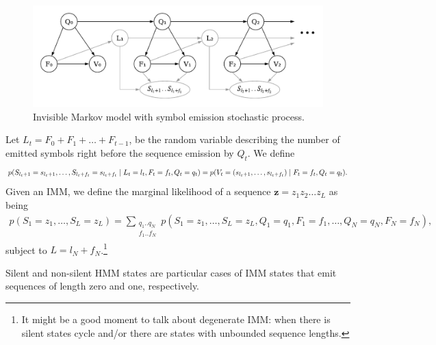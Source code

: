 \begin{figure}[htbp]
\centering
\includegraphics[width=.6\linewidth]{imm-s}
\caption{Invisible Markov model with symbol emission stochastic process.}%
\label{fig:imm-s}
\end{figure}

Let $L_t=F_0+F_1+\dots + F_{t-1}$, be the random variable describing the number of emitted symbols right
before the sequence emission by $Q_t$.
We define
\begin{align*}
    p(S_{l_t+1}=s_{l_t+1}, \dots, S_{l_t+f_t}=s_{l_t+f_t} \;|\; L_t=l_t, F_t=f_t, Q_t=q_t) =
                                p(V_t=(s_{l_t+1}, \dots, s_{l_t+f_t}) \;|\; F_t=f_t, Q_t=q_t).
\end{align*}
Given an IMM, we define the marginal likelihood of a sequence $\mathbf z = z_1z_2\dots z_L$
as being
\begin{align*}
    p(S_1=z_1, \dots, S_L=z_L) = \sum\limits_{\substack{q_1..q_N \\ f_1..f_N}}
        p(S_1=z_1, \dots, S_L=z_L, Q_1=q_1, F_1=f_1, \dots, Q_N=q_N, F_N=f_N),
\end{align*}
subject to $L=l_N+f_N$.\footnote{It might be a good moment to talk about degenerate IMM: when there is silent states cycle and/or
there are states with unbounded sequence lengths.}

Silent and non-silent HMM states are particular cases of IMM states that emit sequences of length zero and one,
respectively.




